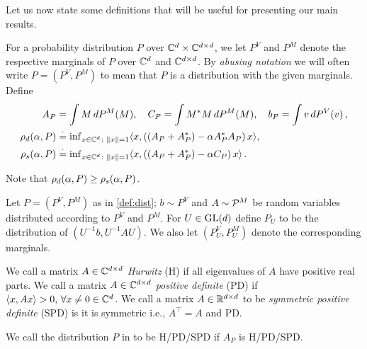 Let us now state some definitions that will be useful for presenting our main results.
\begin{definition}\label{def:dist}
For a probability distribution $P$ over $\C^d \times \C^{d\times d}$, we let $P^V$ and $P^M$ 
denote the respective marginals of $P$ over $\C^d$ and $\C^{d\times d}$. 
By \emph{abusing notation} we will often write $P = (P^V,P^M)$ to mean that $P$ is a distribution with the given marginals.
Define
\begin{align*}
A_P&=\int M\, dP^M(M),\quad C_P=\int M^* M \,dP^M(M), \quad b_P=\int v\, dP^V(v)\,,\\
\rhod{P}&\eqdef {\inf}_{x\in\C^d\colon\norm{x}=1}\ip{x,\left((A_P+A_P^*)-\alpha A_P^* A_P\right)x},\\ \rhos{P}&\eqdef{\inf}_{x\in \C^d\colon\norm{x}=1}\ip{x,\left((A_P+A_P^*)-\alpha C_P\right)x}\,.
\end{align*}
\end{definition}
Note that $\rhod{P}\ge \rhos{P}$.   
\begin{definition}\label{def:simdist}
Let $P=(P^V,P^M)$ as in \cref{def:dist}; $b\sim P^V$ and $A\sim \P^M$ be random variables distributed according to $P^V$ and $P^M$. For $U\in \gld$ define $P_U$ to be the  distribution of $(U^{-1}b,U^{-1}AU)$. We also let
$(P_U^V,P_U^M)$ denote the corresponding marginals. 
\end{definition}
\begin{definition}
We call a matrix $A\in \C^{\dcd}$  \emph{Hurwitz} (H) if all eigenvalues of $A$ have positive real parts. We call a matrix $A\in \C^{\dcd}$ \emph{positive definite} (PD) if $\ip{x,Ax} >0,\,\forall x\neq 0 \in \C^{d}$.  
We call a matrix $A\in \R^{\dcd}$ to be \emph{symmetric positive definite} (SPD) is it is symmetric i.e., $A^\top=A$ and PD. 
\end{definition}
\begin{definition}\label{distpd}
We call the distribution $P$ in  to be H/PD/SPD if $A_P$ is H/PD/SPD.
\end{definition}
